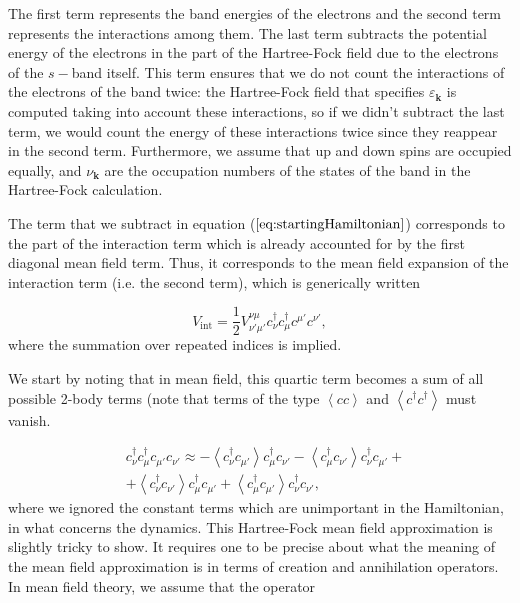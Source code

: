 The first term represents the band energies of the electrons and the second term represents the interactions among them. The last term subtracts the potential energy of the electrons in the part of the Hartree-Fock field due to the electrons of the $s-$band itself. This term ensures that we do not count the interactions of the electrons of the band twice: the Hartree-Fock field that specifies $\varepsilon_{\bm k}$ is computed taking into account these interactions, so if we didn't subtract the last term, we would count the energy of these interactions twice since they reappear in the second term. Furthermore, we assume that up and down spins are occupied equally, and $\nu_{\bm k}$ are the occupation numbers of the states of the band in the Hartree-Fock calculation. 

The term that we subtract in equation ($\ref{eq:startingHamiltonian}$) corresponds to the part of the interaction term which is already accounted for by the first diagonal mean field term. Thus, it corresponds to the mean field expansion of the interaction term (i.e. the second term), which is generically written

\begin{equation}
V_{\text{int}} = \frac{1}{2} V^{\nu\mu}_{\nu'\mu'} c_\nu^\dagger c_\mu^\dagger c^{\mu'} c^{\nu'} ,
\end{equation}
where the summation over repeated indices is implied.

We start by noting that in mean field, this quartic term becomes a sum of all possible 2-body terms (note that terms of the type $\left\langle cc \right\rangle$ and $\left\langle c^\dagger c^\dagger \right\rangle$ must vanish.

\begin{equation}\label{eq:c_mft}
\begin{split}
&c_\nu^\dagger c_\mu^\dagger c_{\mu'} c_{\nu'} \approx - \left\langle c_\nu^\dagger c_{\mu'} \right\rangle  c_{\mu}^\dagger c_{\nu'} - \left\langle c_{\mu}^\dagger c_{\nu'} \right\rangle c_{\nu}^\dagger c_{\mu'} + \\
&+ \left\langle c_{\nu}^\dagger c_{\nu'} \right\rangle  c_{\mu}^\dagger c_{\mu'} + \left\langle c_{\mu}^\dagger c_{\mu'} \right\rangle  c_{\nu}^\dagger c_{\nu'} ,
\end{split}
\end{equation}
where we ignored the constant terms which are unimportant in the Hamiltonian, in what concerns the dynamics. This Hartree-Fock mean field approximation is slightly tricky to show. It requires one to be precise about what the meaning of the mean field approximation is in terms of creation and annihilation operators. In mean field theory, we assume that the operator

